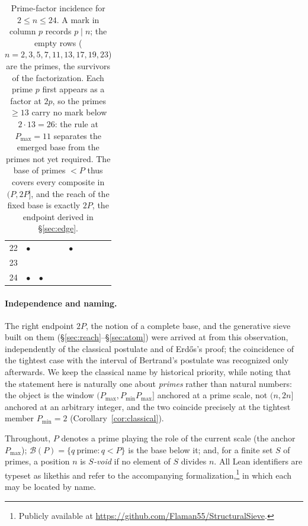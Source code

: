 \documentclass[11pt,a4paper]{amsart}
\theoremstyle{plain}
\theoremstyle{definition}
\theoremstyle{plain}
\theoremstyle{remark}
\newcommand{\lean}[1]{\begingroup\upshape\ttfamily\def\_{\textunderscore\allowbreak}#1\endgroup}
\begin{document}
\begin{table}[htbp]
\begin{tabular}{r|ccccc|cccc}
22 & $\bullet$  &            &            &            & $\bullet$  & & & &\\
23 &            &            &            &            &            & & & &\\
24 & $\bullet$  & $\bullet$  &            &            &            & & & &\\
\end{tabular}
\caption{Prime-factor incidence for $2\le n\le 24$. A mark in column $p$ records $p\mid n$;
the empty rows ($n=2,3,5,7,11,13,17,19,23$) are the primes, the survivors of the
factorization. Each prime $p$ first appears as a factor at $2p$, so the primes $\ge 13$ carry
no mark below $2\cdot13=26$: the rule at $P_{\max}=11$ separates the emerged base from the
primes not yet required. The base of primes $<P$ thus covers every composite in $(P,2P]$, and
the reach of the fixed base is exactly $2P$, the endpoint derived in \S\ref{sec:edge}.}
\label{tab:incidence}
\end{table}

\paragraph{Independence and naming.}
The right endpoint $2P$, the notion of a complete base, and the generative sieve built on
them (\S\ref{sec:reach}--\S\ref{sec:atom}) were arrived at from this observation,
independently of the classical postulate and of Erd\H{o}s's proof; the coincidence of the
tightest case with the interval of Bertrand's postulate was recognized only afterwards. We
keep the classical name by historical priority, while noting that the statement here is
naturally one about \emph{primes} rather than natural numbers: the object is the window
$(P_{\max},P_{\min}P_{\max}]$ anchored at a prime scale, not $(n,2n]$ anchored at an
arbitrary integer, and the two coincide precisely at the tightest member $P_{\min}=2$
(Corollary~\ref{cor:classical}).

Throughout, $P$ denotes a prime playing the role of the current scale (the anchor
$P_{\max}$); $\mathcal{B}(P)=\{q\ \text{prime}: q<P\}$ is the base below it; and, for a
finite set $S$ of primes, a position $n$ is \emph{$S$-void} if no element of $S$ divides
$n$. All Lean identifiers are typeset as \lean{like\_this} and refer to the accompanying
formalization,\footnote{Publicly available at
\url{https://github.com/Flaman55/StructuralSieve}.}
in which each may be located by name.

\end{document}
